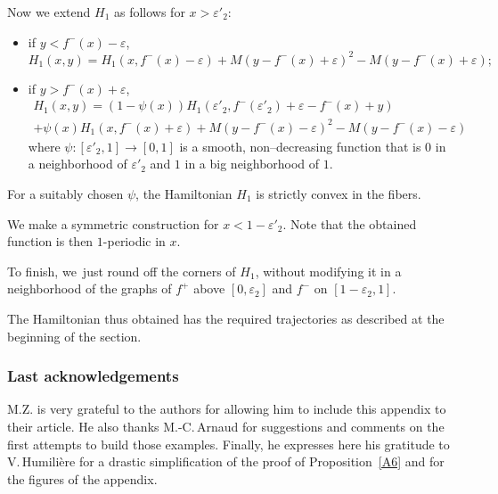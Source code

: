 \documentclass[JEP,XML,SOM,Unicode,NoFloatCountersInSection,published]{cedram}
\theoremstyle{definition}
\begin{document}
\begin{appendix}
Now we extend $H_1$ as follows for $x>\varepsilon'_2$:
\begin{itemize}
\item if $y< f^-(x)-\varepsilon$,
\[
H_1(x,y) = H_1(x,f^-(x)-\varepsilon) + M(y-f^-(x)+\varepsilon)^2- M(y-f^-(x)+\varepsilon);
\]
\item if $y> f^-(x)+\varepsilon$,
\begin{multline*}
H_1(x,y)=(1- \psi(x)) H_1(\varepsilon'_2,f^-(\varepsilon'_2)+\varepsilon-f^-(x)+y) \\
+\psi(x) H_1(x,f^-(x)+\varepsilon) + M(y-f^-(x)-\varepsilon)^2- M(y-f^-(x)-\varepsilon)
\end{multline*}
where $\psi : [\varepsilon'_2,1] \to [0,1]$ is a smooth, non--decreasing function that is $0$ in a neighborhood of $\varepsilon'_2$ and $1$ in a big neighborhood of $1$.
\end{itemize}
For a suitably chosen $\psi$, the Hamiltonian $H_1$ is strictly convex in the fibers.

We make a symmetric construction for $x<1-\varepsilon'_2$. Note that the obtained function is then $1$-periodic in $x$.

To finish, we~just round off the corners of $H_1$, without modifying it in a neighborhood of the graphs of $f^+$ above $[0,\varepsilon_2]$ and $f^-$ on $[1-\varepsilon_2,1]$.

The Hamiltonian thus obtained has the required trajectories as described at the beginning of the section.

\subsubsection*{Last acknowledgements}
M.Z. is very grateful to the authors for allowing him to include this appendix to their article. He also thanks M.-C.\,Arnaud for suggestions and comments on the first attempts to build those examples. Finally, he expresses here his gratitude to V.\,Humilière for a drastic simplification of the proof of Proposition~\ref{A6} and for the figures of the appendix.

\end{appendix}

\backmatter


\end{document}
